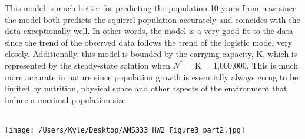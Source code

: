\documentclass[12pt]{article}
\begin{document}
This model is much better for predicting the population 10 years from now since the model both predicts the squirrel population accurately and coincides with the data exceptionally well. In other words, the model is a very good fit to the data since the trend of the observed data follows the trend of the logistic model very closely. Additionally, this model is bounded by the carrying capacity, K, which is represented by the steady-state solution when $N^{*}$ = K = 1,000,000. This is much more accurate in nature since population growth is essentially always going to be limited by nutrition, physical space and other aspects of the environment that induce a maximal population size. \\\

\begin{center}
   \texttt{[image: /Users/Kyle/Desktop/AMS333\_HW2\_Figure3\_part2.jpg]}
\end{center}\
\end{document}
